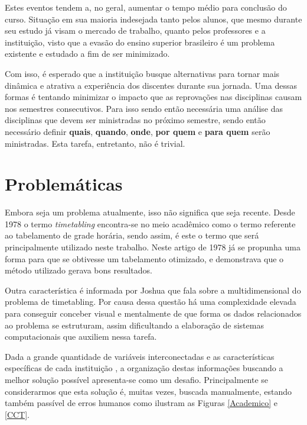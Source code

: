 Estes eventos tendem a, no geral, aumentar o tempo médio para conclusão do curso. Situação em sua maioria indesejada tanto pelos alunos, que mesmo durante seu estudo já visam o mercado de trabalho, quanto pelos professores e a instituição, visto que a evasão do ensino superior brasileiro é um problema existente e estudado a fim de ser minimizado.


Com isso, é esperado que a instituição busque alternativas para tornar mais dinâmica e atrativa a experiência dos discentes durante sua jornada. Uma dessas formas é tentando minimizar o impacto que as reprovações nas disciplinas causam nos semestres consecutivos. Para isso sendo então necessária uma análise das disciplinas que devem ser ministradas no próximo semestre, sendo então necessário definir \textbf{quais}, \textbf{quando}, \textbf{onde}, \textbf{por quem} e \textbf{para quem} serão ministradas. Esta tarefa, entretanto, não é trivial.

\section{Problemáticas} %

Embora seja um problema atualmente, isso não significa que seja recente. Desde 1978 \cite{barham_simple_1978} o termo \textit{timetabling} encontra-se no meio acadêmico como o termo referente ao tabelamento de grade horária, sendo assim, é este o termo que será principalmente utilizado neste trabalho. Neste artigo de 1978 já se propunha uma forma para que se obtivesse um tabelamento otimizado, e demonstrava que o método utilizado gerava bons resultados.

Outra característica é informada por Joshua \cite{thomas_visualization_2009} que fala sobre a multidimensional do problema de timetabling. Por causa dessa questão há uma complexidade elevada para conseguir conceber visual e mentalmente de que forma os dados relacionados ao problema se estruturam, assim dificultando a elaboração de sistemas computacionais que auxiliem nessa tarefa.

Dada a grande quantidade de variáveis interconectadas e as características específicas de cada instituição \cite{miranda_udpskeduler_2012}, a organização destas informações buscando a melhor solução possível apresenta-se como um desafio. Principalmente se considerarmos que esta solução é, muitas vezes, buscada manualmente, estando também passível de erros humanos como ilustram as Figuras \ref{Academico} e \ref{CCT}.

